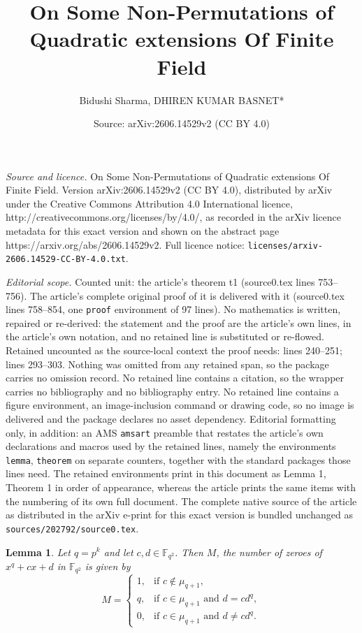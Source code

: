\documentclass[10pt,a4paper]{amsart}
\title{On Some Non-Permutations of Quadratic extensions Of Finite Field}
\author{Bidushi Sharma, DHIREN KUMAR BASNET*}
\date{Source: arXiv:2606.14529v2 (CC BY 4.0)}
\newtheorem{lemma}{Lemma}
\begin{document}
\maketitle

\noindent\emph{Source and licence.} On Some Non-Permutations of Quadratic extensions Of Finite Field. Version arXiv:2606.14529v2 (CC BY 4.0), distributed by arXiv under the Creative Commons Attribution 4.0 International licence, http://creativecommons.org/licenses/by/4.0/, as recorded in the arXiv licence metadata for this exact version and shown on the abstract page https://arxiv.org/abs/2606.14529v2. Full licence notice: \texttt{licenses/arxiv-2606.14529-CC-BY-4.0.txt}.\par\smallskip

\noindent\textit{Editorial scope.} Counted unit: the article's theorem t1 (source0.tex lines 753--756). The article's complete original proof of it is delivered with it (source0.tex lines 758--854, one \texttt{proof} environment of 97 lines). No mathematics is written, repaired or re-derived: the statement and the proof are the article's own lines, in the article's own notation, and no retained line is substituted or re-flowed.  Retained uncounted as the source-local context the proof needs: lines 240--251; lines 293--303.  Nothing was omitted from any retained span, so the package carries no omission record.  No retained line contains a citation, so the wrapper carries no bibliography and no bibliography entry.  No retained line contains a figure environment, an image-inclusion command or drawing code, so no image is delivered and the package declares no asset dependency.  Editorial formatting only, in addition: an AMS \texttt{amsart} preamble that restates the article's own declarations and macros used by the retained lines, namely the environments \texttt{lemma}, \texttt{theorem} on separate counters, together with the standard packages those lines need.  The retained environments print in this document as Lemma 1, Theorem 1 in order of appearance, whereas the article prints the same items with the numbering of its own full document.  The complete native source of the article as distributed in the arXiv e-print for this exact version is bundled unchanged as \texttt{sources/202792/source0.tex}.
\begin{lemma}\label{l5}
Let $q=p^k$ and let $c,d \in \mathbb{F}_{q^2}$. Then $M$, the number of zeroes of $
x^q+cx+d$
in $\mathbb{F}_{q^2}$ is given by
$$
M=\begin{cases}
1, & \text{if } c \notin \mu_{q+1},\\[1mm]
q, & \text{if } c \in \mu_{q+1} \text{ and } d=cd^q,\\[1mm]
0, & \text{if } c \in \mu_{q+1} \text{ and } d \neq cd^q.
\end{cases}
$$
\end{lemma}
\end{document}
